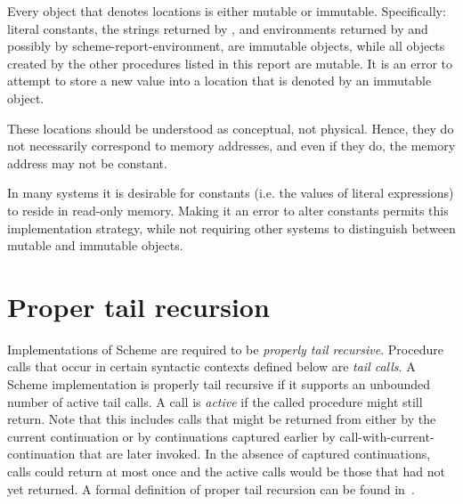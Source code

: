 Every object that denotes locations is 
either mutable or
immutable.  Specifically: literal constants, the strings
returned by , and environments
returned by  and possibly by {\cf scheme-report-environment},
are immutable objects, while all objects
created by the other procedures listed in this report are mutable.
It is an
error to attempt to store a new value into a location that is denoted by an
immutable object.

These locations should be understood as conceptual, not physical.
Hence, they do not necessarily correspond to memory addresses,
and even if they do, the memory address may not be constant.

\begin{rationale}
In many systems it is desirable for constants (i.e. the values of
literal expressions) to reside in read-only memory.
Making it an error to alter constants permits this implementation strategy,
while not requiring other systems to distinguish between
mutable and immutable objects.
\end{rationale}

\section{Proper tail recursion}
\label{proper tail recursion}

Implementations of Scheme are required to be
{\em properly tail recursive}.
Procedure calls that occur in certain syntactic
contexts defined below are {\em tail calls}.  A Scheme implementation is
properly tail recursive if it supports an unbounded number of active
tail calls.  A call is {\em active} if the called procedure might still
return.  Note that this includes calls that might be returned from either
by the current continuation or by continuations captured earlier by
{\cf call-with-current-continuation} that are later invoked.
In the absence of captured continuations, calls could
return at most once and the active calls would be those that had not
yet returned.
A formal definition of proper tail recursion can be found
in~\cite{propertailrecursion}.

